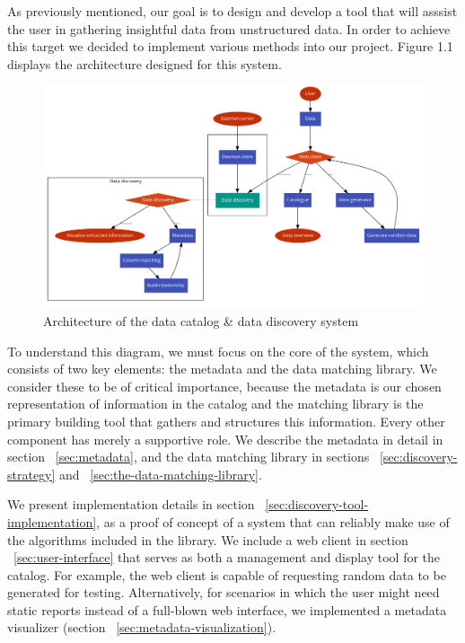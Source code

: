 As previously mentioned, our goal is to design and develop a tool that will asssist the user in gathering insightful data from unstructured data.
In order to achieve this target we decided to implement various methods into our project.
Figure 1.1 displays the architecture designed for this system.
\begin {figure} [h]
    \centering
    \includegraphics[width=16cm]{figures/architecture}
    \caption {Architecture of the data catalog \& data discovery system}
    \label {fig:architecture_diagram}
\end{figure}

To understand this diagram, we must focus on the core of the system, which consists of two key elements: the metadata and
the data matching library.
We consider these to be of critical importance, because the metadata is our chosen representation of information in the
catalog and the matching library is the primary building tool that gathers and structures this information.
Every other component has merely a supportive role.
We describe the metadata in detail in section ~\ref{sec:metadata}, and the data matching library in sections
~\ref{sec:discovery-strategy} and ~\ref{sec:the-data-matching-library}.

We present implementation details in section ~\ref{sec:discovery-tool-implementation}, as a proof of concept of a system
that can reliably make use of the algorithms included in the library.
We include a web client in section ~\ref{sec:user-interface} that serves as both a management and display tool for the catalog.
For example, the web client is capable of requesting random data to be generated for testing.
Alternatively, for scenarios in which the user might need static reports instead of a full-blown web interface, we implemented
a metadata visualizer (section ~\ref{sec:metadata-visualization}).


